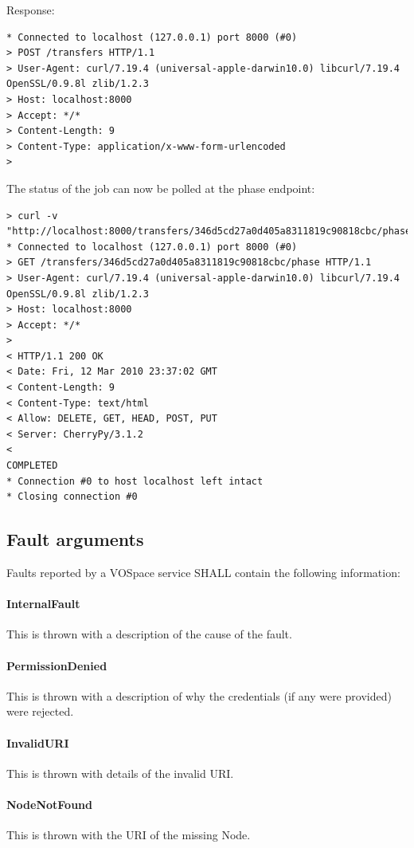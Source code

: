 \documentclass[11pt,a4paper]{ivoa}
\begin{document}
Response:
\begin{lstlisting}
* Connected to localhost (127.0.0.1) port 8000 (#0)
> POST /transfers HTTP/1.1
> User-Agent: curl/7.19.4 (universal-apple-darwin10.0) libcurl/7.19.4 OpenSSL/0.9.8l zlib/1.2.3
> Host: localhost:8000
> Accept: */*
> Content-Length: 9
> Content-Type: application/x-www-form-urlencoded
> 
\end{lstlisting}
The status of the job can now be polled at the phase endpoint:
\begin{lstlisting}
> curl -v "http://localhost:8000/transfers/346d5cd27a0d405a8311819c90818cbc/phase"
* Connected to localhost (127.0.0.1) port 8000 (#0)
> GET /transfers/346d5cd27a0d405a8311819c90818cbc/phase HTTP/1.1
> User-Agent: curl/7.19.4 (universal-apple-darwin10.0) libcurl/7.19.4 OpenSSL/0.9.8l zlib/1.2.3
> Host: localhost:8000
> Accept: */*
> 
< HTTP/1.1 200 OK
< Date: Fri, 12 Mar 2010 23:37:02 GMT
< Content-Length: 9
< Content-Type: text/html
< Allow: DELETE, GET, HEAD, POST, PUT
< Server: CherryPy/3.1.2
<
COMPLETED
* Connection #0 to host localhost left intact
* Closing connection #0
\end{lstlisting}

\subsection{Fault arguments}
Faults reported by a VOSpace service SHALL contain the following information:

\paragraph{InternalFault}
This is thrown with a description of the cause of the fault.

\paragraph{PermissionDenied}
This is thrown with a description of why the credentials (if any were provided) were rejected.

\paragraph{InvalidURI}
This is thrown with details of the invalid URI.

\paragraph{NodeNotFound}
This is thrown with the URI of the missing Node.
\end{document}
